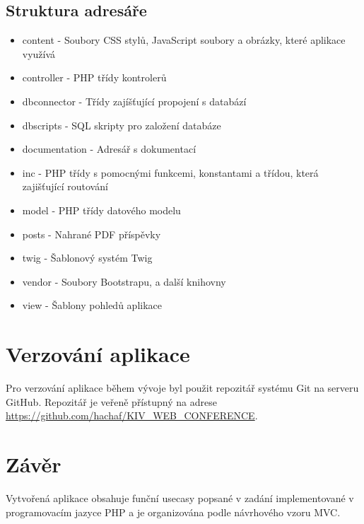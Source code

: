 \documentclass[12pt, a4paper]{article}
\begin{document}
\subsection{Struktura adresáře}
\begin{itemize}
    \item{content} - Soubory CSS stylů, JavaScript soubory a obrázky, které aplikace využívá
    \item{controller} - PHP třídy kontrolerů
    \item{dbconnector} - Třídy zajíšťující propojení s databází
    \item{dbscripts} - SQL skripty pro založení databáze
    \item{documentation} - Adresář s dokumentací
    \item{inc} - PHP třídy s pomocnými funkcemi, konstantami a třídou, která zajišťující routování
    \item{model} - PHP třídy datového modelu
    \item{posts} - Nahrané PDF příspěvky
    \item{twig} - Šablonový systém Twig
    \item{vendor} - Soubory Bootstrapu, a další knihovny
    \item{view} - Šablony pohledů aplikace
\end{itemize}

\section{Verzování aplikace}
\par Pro verzování aplikace během vývoje byl použit repozitář systému Git na serveru GitHub. Repozitář je veřeně
přístupný na adrese \url{https://github.com/hachaf/KIV_WEB_CONFERENCE}.

\section{Závěr}
\par Vytvořená aplikace obsahuje funční usecasy popsané v zadání implementované v programovacím jazyce PHP a je
organizována podle návrhového vzoru MVC.


\appendix
\newpage
\end{document}
